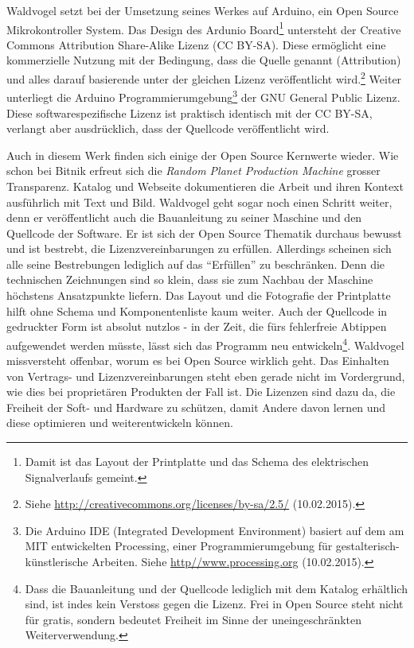 \documentclass[
paper=164mm:234mm, %
pagesize, %
DIV=calc, %
10pt, %
BCOR=0mm, %
parskip=half- %
]{scrbook}
\begin{document}
Waldvogel setzt bei der Umsetzung seines Werkes auf Arduino, ein Open Source Mikrokontroller System. Das Design des Ardunio Board\footnote{Damit ist das Layout der Printplatte und das Schema des elektrischen Signalverlaufs gemeint.} untersteht der Creative Commons Attribution Share-Alike Lizenz (CC BY-SA). Diese ermöglicht eine kommerzielle Nutzung mit der Bedingung, dass die Quelle genannt (Attribution) und alles darauf basierende unter der gleichen Lizenz veröffentlicht wird.\footnote{Siehe \url{http://creativecommons.org/licenses/by-sa/2.5/} (10.02.2015).} Weiter unterliegt die Arduino Programmierumgebung\footnote{Die Arduino IDE (Integrated Development Environment) basiert auf dem am MIT entwickelten Processing, einer Programmierumgebung für gestalterisch-künstlerische Arbeiten. Siehe \url{http//www.processing.org} (10.02.2015).} der GNU General Public Lizenz. Diese softwarespezifische Lizenz ist praktisch identisch mit der CC BY-SA, verlangt aber ausdrücklich, dass der Quellcode veröffentlicht wird.

Auch in diesem Werk finden sich einige der Open Source Kernwerte wieder. Wie schon bei Bitnik erfreut sich die \emph{Random Planet Production Machine} grosser Transparenz. Katalog und Webseite dokumentieren die Arbeit und ihren Kontext ausführlich mit Text und Bild. Waldvogel geht sogar noch einen Schritt weiter, denn er veröffentlicht auch die Bauanleitung zu seiner Maschine und den Quellcode der Software. Er ist sich der Open Source Thematik durchaus bewusst und ist bestrebt, die Lizenzvereinbarungen zu erfüllen. Allerdings scheinen sich alle seine Bestrebungen lediglich auf das \enquote{Erfüllen} zu beschränken. Denn die technischen Zeichnungen sind so klein, dass sie zum Nachbau der Maschine höchstens Ansatzpunkte liefern. Das Layout und die Fotografie der Printplatte hilft ohne Schema und Komponentenliste kaum weiter. Auch der Quellcode in gedruckter Form ist absolut nutzlos - in der Zeit, die fürs fehlerfreie Abtippen aufgewendet werden müsste, lässt sich das Programm neu entwickeln\footnote{Dass die Bauanleitung und der Quellcode lediglich mit dem Katalog erhältlich sind, ist indes kein Verstoss gegen die Lizenz. Frei in Open Source steht nicht für gratis, sondern bedeutet Freiheit im Sinne der uneingeschränkten Weiterverwendung.}. Waldvogel missversteht offenbar, worum es bei Open Source wirklich geht. Das Einhalten von Vertrags- und Lizenzvereinbarungen steht eben gerade nicht im Vordergrund, wie dies bei proprietären Produkten der Fall ist. Die Lizenzen sind dazu da, die Freiheit der Soft- und Hardware zu schützen, damit Andere davon lernen und diese optimieren und weiterentwickeln können.
\end{document}
